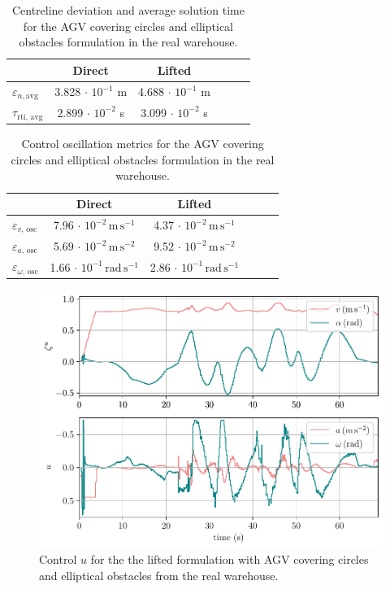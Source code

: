 \begin{table}[tb]
    \small
	\begin{center}
        \begin{tabular}{lccccl}\toprule
		    & \textbf{Direct} & \textbf{Lifted}\\
            \midrule
            $\varepsilon_{n, \mathrm{avg}} $ & 3.828 $\cdot$ $10^{-1}$ m& 4.688 $\cdot$ $10^{-1}$ m\\
            $\tau_{\mathrm{rti,\,avg}} $ & 2.899 $\cdot$ $10^{-2}$ s& 3.099 $\cdot$ $10^{-2}$ s\\
		    \bottomrule
		\end{tabular}
	\end{center}
    \caption{Centreline deviation and average solution time for the \ac{AGV} covering circles and elliptical obstacles formulation in the real warehouse.}
    \label{tab_rti_agv}
\end{table}
\begin{table}[h!]
    \small
	\begin{center}
        \begin{tabular}{lccccl}\toprule
		    & \textbf{Direct} & \textbf{Lifted}\\
            \midrule
            $\varepsilon_{v,\,\mathrm{osc}} $ & 7.96 $\cdot$ $10^{-2}\,\mathrm{m\,s^{-1}}$& 4.37 $\cdot$ $10^{-2}\,\mathrm{m\,s^{-1}}$\\
            $\varepsilon_{a,\,\mathrm{osc}} $ & 5.69 $\cdot$ $10^{-2}\,\mathrm{m\,s^{-2}}$& 9.52 $\cdot$ $10^{-2}\,\mathrm{m\,s^{-2}}$\\
            $\varepsilon_{\omega,\,\mathrm{osc}} $ & 1.66 $\cdot$ $10^{-1}\,\mathrm{rad\,s^{-1}}$& 2.86 $\cdot$ $10^{-1}\,\mathrm{rad\,s^{-1}}$\\
		    \bottomrule
		\end{tabular}
	\end{center}
    \caption{Control oscillation metrics for the \ac{AGV} covering circles and elliptical obstacles formulation in the real warehouse.}
    \label{tab_u_osc_agv_2el}
\end{table}
\begin{figure}[h!]
    \includegraphics[width=1\textwidth]{figures/experiments/u_time}
    \caption{Control $u$ for the the lifted formulation with \ac{AGV} covering circles and elliptical obstacles from the real warehouse.}  \label{fig_u_time}
\end{figure}